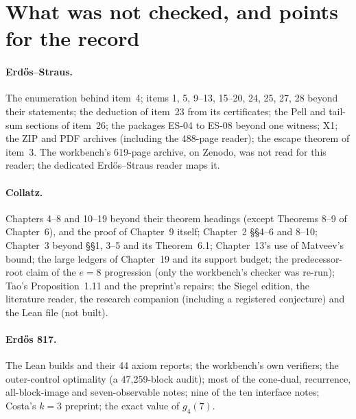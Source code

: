 \section{What was not checked, and points for the record}\label{sec:unchecked}

\paragraph{Erdős--Straus.} The enumeration behind item~4; items 1, 5, 9--13, 15--20, 24, 25, 27, 28 beyond their statements; the deduction of item~23 from its certificates; the Pell and tail-sum sections of item~26; the packages ES-04 to ES-08 beyond one witness; X1; the ZIP and PDF archives (including the 488-page reader); the escape theorem of item~3. The workbench's 619-page archive, on Zenodo, was not read for this reader; the dedicated Erdős--Straus reader \cite{ESReader} maps it.

\paragraph{Collatz.} Chapters 4--8 and 10--19 beyond their theorem headings (except Theorems 8--9 of Chapter~6), and the proof of Chapter~9 itself; Chapter~2 §§4--6 and 8--10; Chapter~3 beyond §§1, 3--5 and its Theorem~6.1; Chapter~13's use of Matveev's bound; the large ledgers of Chapter~19 and its support budget; the predecessor-root claim of the $e=8$ progression (only the workbench's checker was re-run); Tao's Proposition~1.11 and the preprint's repairs; the Siegel edition, the literature reader, the research companion (including a registered conjecture) and the Lean file (not built).

\paragraph{Erdős 817.} The Lean builds and their 44 axiom reports; the workbench's own verifiers; the outer-control optimality (a 47{,}259-block audit); most of the cone-dual, recurrence, all-block-image and seven-observable notes; nine of the ten interface notes; Costa's $k=3$ preprint; the exact value of $g_4(7)$.


